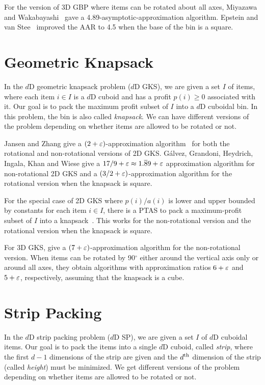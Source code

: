 For the version of 3D GBP where items can be rotated about all axes,
Miyazawa and Wakabayashi~\cite{miyazawa2009three} gave a
4.89-asymptotic-approximation algorithm.
Epstein and van Stee~\cite{epstein2006side} improved the AAR to
4.5 when the base of the bin is a square.

\section{Geometric Knapsack}

In the $d$D geometric knapsack problem ($d$D GKS), we are given a set $I$ of items,
where each item $i \in I$ is a $d$D cuboid and has a profit $p(i) \ge 0$ associated with it.
Our goal is to pack the maximum profit subset of $I$ into a $d$D cuboidal bin.
In this problem, the bin is also called \emph{knapsack}.
We can have different versions of the problem depending on whether items
are allowed to be rotated or not.

Jansen and Zhang give a $(2+\varepsilon)$-approximation algorithm~\cite{jansen2004rectangle}
for both the rotational and non-rotational versions of 2D GKS.
G\'alvez, Grandoni, Heydrich, Ingala, Khan and Wiese give a
$17/9 + \varepsilon \approx 1.\overline{8}9 + \varepsilon$ approximation algorithm
for non-rotational 2D GKS and a $(3/2 + \varepsilon)$-approximation algorithm
for the rotational version when the knapsack is square.

For the special case of 2D GKS where $p(i)/a(i)$ is lower and upper bounded by constants
for each item $i \in I$, there is a PTAS to pack a maximum-profit subset of $I$
into a knapsack~\cite{bansal2009structural}. This works for the non-rotational version
and the rotational version when the knapsack is square.

For 3D GKS, \cite{diedrich2008approximation} give a $(7+\varepsilon)$-approximation
algorithm for the non-rotational version.
When items can be rotated by 90$^{\circ}$ either around the vertical axis only
or around all axes, they obtain algorithms with approximation ratios
$6 + \varepsilon$ and $5 + \varepsilon$, respectively, assuming that the knapsack is a cube.

\section{Strip Packing}

In the $d$D strip packing problem ($d$D SP),
we are given a set $I$ of $d$D cuboidal items.
Our goal is to pack the items into a single $d$D cuboid, called \emph{strip},
where the first $d-1$ dimensions of the strip are given
and the $d^{\textrm{th}}$ dimension of the strip (called \emph{height}) must be minimized.
We get different versions of the problem depending on whether
items are allowed to be rotated or not.

